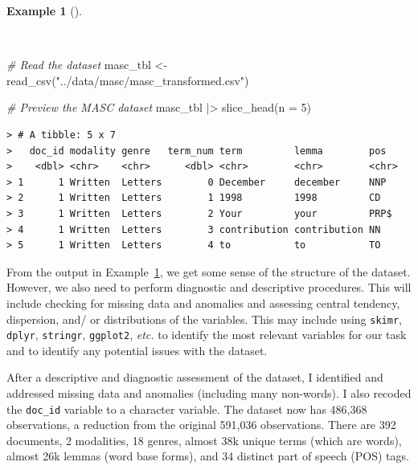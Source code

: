 \documentclass[
  letterpaper,
  DIV=11,
  numbers=noendperiod]{scrreprt}
\newenvironment{Shaded}{\begin{snugshade}}{\end{snugshade}}
\newcommand{\AttributeTok}[1]{\textcolor[rgb]{0.00,0.00,0.00}{#1}}
\newcommand{\CommentTok}[1]{\textcolor[rgb]{0.00,0.00,0.00}{\textit{#1}}}
\newcommand{\DecValTok}[1]{\textcolor[rgb]{0.00,0.00,0.00}{#1}}
\newcommand{\FunctionTok}[1]{\textcolor[rgb]{0.00,0.00,0.00}{#1}}
\newcommand{\NormalTok}[1]{\textcolor[rgb]{0.00,0.00,0.00}{#1}}
\newcommand{\OtherTok}[1]{\textcolor[rgb]{0.00,0.00,0.00}{#1}}
\newcommand{\SpecialCharTok}[1]{\textcolor[rgb]{0.00,0.00,0.00}{#1}}
\newcommand{\StringTok}[1]{\textcolor[rgb]{0.00,0.00,0.00}{#1}}
\theoremstyle{definition}
\newtheorem{example}{Example}[chapter]
\theoremstyle{remark}
\begin{document}
\begin{example}[]\protect\hypertarget{exm-eda-masc-read}{}\label{exm-eda-masc-read}

~

\begin{Shaded}
\begin{Highlighting}[]
\CommentTok{\# Read the dataset}
\NormalTok{masc\_tbl }\OtherTok{\textless{}{-}}
  \FunctionTok{read\_csv}\NormalTok{(}\StringTok{"../data/masc/masc\_transformed.csv"}\NormalTok{)}

\CommentTok{\# Preview the MASC dataset}
\NormalTok{masc\_tbl }\SpecialCharTok{|\textgreater{}}
  \FunctionTok{slice\_head}\NormalTok{(}\AttributeTok{n =} \DecValTok{5}\NormalTok{)}
\end{Highlighting}
\end{Shaded}

\begin{verbatim}
> # A tibble: 5 x 7
>   doc_id modality genre   term_num term         lemma        pos  
>    <dbl> <chr>    <chr>      <dbl> <chr>        <chr>        <chr>
> 1      1 Written  Letters        0 December     december     NNP  
> 2      1 Written  Letters        1 1998         1998         CD   
> 3      1 Written  Letters        2 Your         your         PRP$ 
> 4      1 Written  Letters        3 contribution contribution NN   
> 5      1 Written  Letters        4 to           to           TO
\end{verbatim}

\end{example}

From the output in Example~\ref{exm-eda-masc-read}, we get some sense of
the structure of the dataset. However, we also need to perform
diagnostic and descriptive procedures. This will include checking for
missing data and anomalies and assessing central tendency, dispersion,
and/ or distributions of the variables. This may include using
\texttt{skimr}, \texttt{dplyr}, \texttt{stringr}, \texttt{ggplot2},
\emph{etc.} to identify the most relevant variables for our task and to
identify any potential issues with the dataset.

After a descriptive and diagnostic assessment of the dataset, I
identified and addressed missing data and anomalies (including many
non-words). I also recoded the \texttt{doc\_id} variable to a character
variable. The dataset now has 486,368 observations, a reduction from the
original 591,036 observations. There are 392 documents, 2 modalities, 18
genres, almost 38k unique terms (which are words), almost 26k lemmas
(word base forms), and 34 distinct part of speech (POS) tags.
\end{document}
